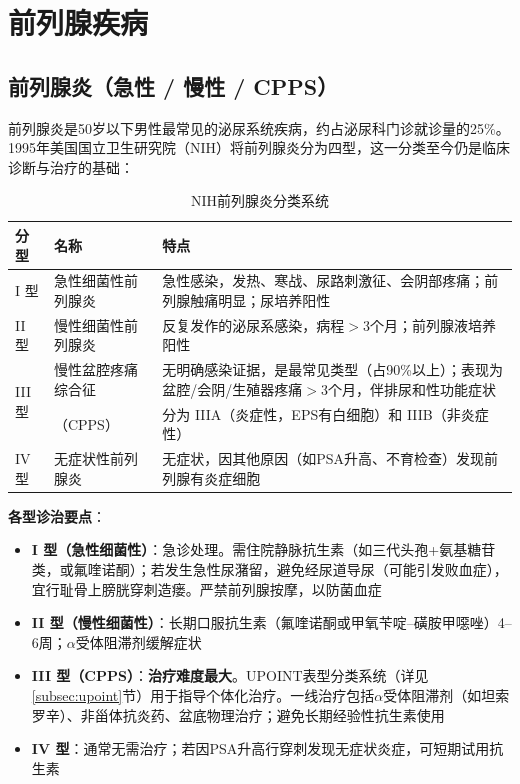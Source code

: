 \section{前列腺疾病}

\subsection{前列腺炎（急性 / 慢性 / CPPS）}

前列腺炎是50岁以下男性最常见的泌尿系统疾病，约占泌尿科门诊就诊量的25\%。1995年美国国立卫生研究院（NIH）将前列腺炎分为四型，这一分类至今仍是临床诊断与治疗的基础：

\begin{table}[htbp]
\centering
\caption{NIH前列腺炎分类系统}
\label{tab:prostatitis_nih}
\begin{tabularx}{\textwidth}{@{}llX@{}}
    \toprule
    \textbf{分型} & \textbf{名称} & \textbf{特点} \\
    \midrule
    I 型 & 急性细菌性前列腺炎 & 急性感染，发热、寒战、尿路刺激征、会阴部疼痛；前列腺触痛明显；尿培养阳性 \\
    II 型 & 慢性细菌性前列腺炎 & 反复发作的泌尿系感染，病程$>$3个月；前列腺液培养阳性 \\
    \multirow{2}{*}{III 型} & 慢性盆腔疼痛综合征 & 无明确感染证据，是最常见类型（占90\%以上）；表现为盆腔/会阴/生殖器疼痛$>$3个月，伴排尿和性功能症状 \\
     & （CPPS） & 分为 IIIA（炎症性，EPS有白细胞）和 IIIB（非炎症性） \\
    IV 型 & 无症状性前列腺炎 & 无症状，因其他原因（如PSA升高、不育检查）发现前列腺有炎症细胞 \\
    \bottomrule
\end{tabularx}
\end{table}

\textbf{各型诊治要点}：

\begin{itemize}[leftmargin=2cm]
	\item \textbf{I 型（急性细菌性）}：急诊处理。需住院静脉抗生素（如三代头孢+氨基糖苷类，或氟喹诺酮）；若发生急性尿潴留，避免经尿道导尿（可能引发败血症），宜行耻骨上膀胱穿刺造瘘。严禁前列腺按摩，以防菌血症
	\item \textbf{II 型（慢性细菌性）}：长期口服抗生素（氟喹诺酮或甲氧苄啶--磺胺甲噁唑）4--6周；$\alpha$受体阻滞剂缓解症状
	\item \textbf{III 型（CPPS）}：\textbf{治疗难度最大}。UPOINT表型分类系统（详见\ref{subsec:upoint}节）用于指导个体化治疗。一线治疗包括$\alpha$受体阻滞剂（如坦索罗辛）、非甾体抗炎药、盆底物理治疗；避免长期经验性抗生素使用
	\item \textbf{IV 型}：通常无需治疗；若因PSA升高行穿刺发现无症状炎症，可短期试用抗生素
\end{itemize}

